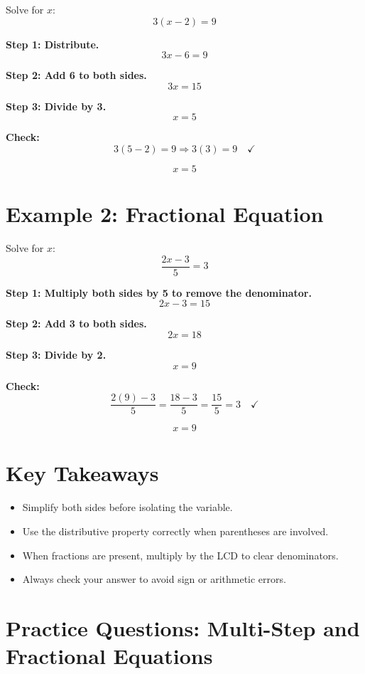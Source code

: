 \documentclass[14pt]{extarticle}
\begin{document}
Solve for \(x\):
\[
3(x - 2) = 9
\]

\textbf{Step 1: Distribute.}
\[
3x - 6 = 9
\]

\textbf{Step 2: Add 6 to both sides.}
\[
3x = 15
\]

\textbf{Step 3: Divide by 3.}
\[
x = 5
\]

\textbf{Check:}
\[
3(5 - 2) = 9 \Rightarrow 3(3) = 9 \quad \checkmark
\]

\[
\boxed{x = 5}
\]

\section*{Example 2: Fractional Equation}

Solve for \(x\):
\[
\dfrac{2x - 3}{5} = 3
\]

\textbf{Step 1: Multiply both sides by 5 to remove the denominator.}
\[
2x - 3 = 15
\]

\textbf{Step 2: Add 3 to both sides.}
\[
2x = 18
\]

\textbf{Step 3: Divide by 2.}
\[
x = 9
\]

\textbf{Check:}
\[
\dfrac{2(9) - 3}{5} = \dfrac{18 - 3}{5} = \dfrac{15}{5} = 3 \quad \checkmark
\]

\[
\boxed{x = 9}
\]

\section*{Key Takeaways}
\begin{itemize}
    \item Simplify both sides before isolating the variable.  
    \item Use the distributive property correctly when parentheses are involved.  
    \item When fractions are present, multiply by the LCD to clear denominators.  
    \item Always check your answer to avoid sign or arithmetic errors.
\end{itemize}

\newpage


\section*{Practice Questions: Multi-Step and Fractional Equations}
\end{document}
